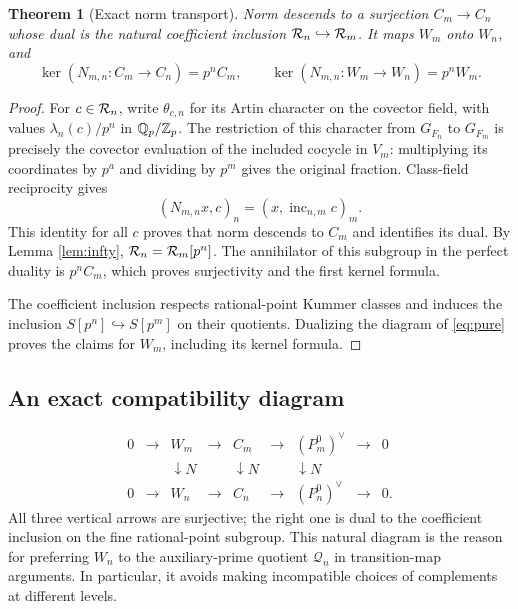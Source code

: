 \documentclass[11pt,a4paper]{article}
\newtheorem{theorem}{Theorem}[section]
\theoremstyle{definition}\newtheorem{definition}[theorem]{Definition}
\theoremstyle{remark}\newtheorem{remark}[theorem]{Remark}
\numberwithin{equation}{section}
\begin{document}
\begin{theorem}[Exact norm transport]\label{th:norm}
Norm descends to a surjection $C_m\to C_n$ whose dual is the natural coefficient inclusion $\mathcal R_n\hookrightarrow\mathcal R_m$. It maps $W_m$ onto $W_n$, and
\begin{equation}\label{eq:normker}
\ker(N_{m,n}:C_m\to C_n)=p^nC_m,\qquad
\ker(N_{m,n}:W_m\to W_n)=p^nW_m.
\end{equation}
\end{theorem}
\begin{proof}
For $c\in\mathcal R_n$, write $\theta_{c,n}$ for its Artin character on the covector field, with values $\lambda_n(c)/p^n$ in $\mathbb Q_p/\mathbb Z_p$. The restriction of this character from $G_{F_n}$ to $G_{F_m}$ is precisely the covector evaluation of the included cocycle in $V_m$: multiplying its coordinates by $p^a$ and dividing by $p^m$ gives the original fraction. Class-field reciprocity gives
\[
(N_{m,n}x,c)_n=(x,\operatorname{inc}_{n,m}c)_m.
\]
This identity for all $c$ proves that norm descends to $C_m$ and identifies its dual. By Lemma \ref{lem:infty}, $\mathcal R_n=\mathcal R_m[p^n]$. The annihilator of this subgroup in the perfect duality is $p^nC_m$, which proves surjectivity and the first kernel formula.

The coefficient inclusion respects rational-point Kummer classes and induces the inclusion $S[p^n]\hookrightarrow S[p^m]$ on their quotients. Dualizing the diagram of \eqref{eq:pure} proves the claims for $W_m$, including its kernel formula.\end{proof}

\subsection*{An exact compatibility diagram}
\[
\begin{array}{ccccccccc}
0&\to&W_m&\to&C_m&\to&(P_m^0)^\vee&\to&0\\
&&\downarrow N&&\downarrow N&&\downarrow N&&\\
0&\to&W_n&\to&C_n&\to&(P_n^0)^\vee&\to&0.
\end{array}
\]
All three vertical arrows are surjective; the right one is dual to the coefficient inclusion on the fine rational-point subgroup. This natural diagram is the reason for preferring $W_n$ to the auxiliary-prime quotient $\mathscr Q_n$ in transition-map arguments. In particular, it avoids making incompatible choices of complements at different levels.
\end{document}
